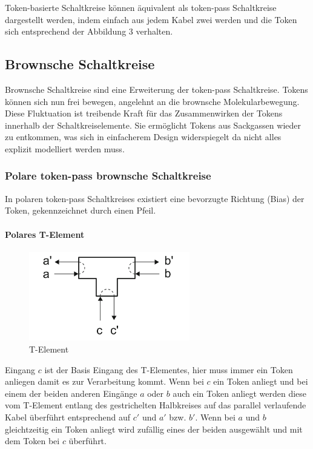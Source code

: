 \documentclass[11pt,a4paper]{article}
\begin{document}
Token-basierte Schaltkreise können äquivalent als token-pass Schaltkreise 
dargestellt werden, indem einfach aus jedem Kabel zwei werden und die Token 
sich entsprechend der Abbildung 3 verhalten.


\subsection{Brownsche Schaltkreise}
Brownsche Schaltkreise sind eine Erweiterung der token-pass Schaltkreise. 
%
Tokens können sich nun frei bewegen, angelehnt an die
brownsche Molekularbewegung.
%
Diese Fluktuation ist treibende Kraft für das Zusammenwirken der Tokens 
innerhalb der Schaltkreiselemente. 
%
Sie ermöglicht Tokens aus Sackgassen wieder zu entkommen,
was sich in einfacherem Design widerspiegelt da nicht alles explizit 
modelliert werden muss.


\subsubsection{Polare token-pass brownsche Schaltkreise}
In polaren token-pass Schaltkreises existiert eine bevorzugte Richtung (Bias)
der Token, gekennzeichnet durch einen Pfeil.
%

\paragraph{Polares T-Element}
\begin{figure}[h]
    \centering
    \includegraphics[width=7cm]{bilder/T_Element.png}
    \caption{T-Element}
    \label{fig:T_Element}
\end{figure}

%
Eingang $ c $ ist der Basis Eingang des T-Elementes, hier muss immer ein Token
anliegen damit es zur Verarbeitung kommt.
%
Wenn bei $ c $ ein Token anliegt und bei einem der beiden anderen
Eingänge $ a $ oder $ b $ auch ein Token anliegt werden diese vom T-Element 
entlang des gestrichelten Halbkreises auf das parallel verlaufende 
Kabel überführt entsprechend auf $ c' $  und $ a'$  bzw. $ b' $.
%
Wenn bei $ a $ und $ b $ gleichtzeitig ein Token anliegt wird zufällig 
eines der beiden ausgewählt und mit dem Token bei $ c $ überführt.
 
\end{document}
